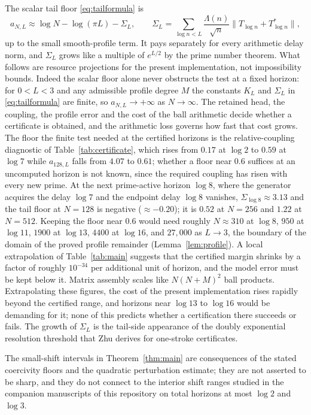 \documentclass[11pt]{article}
\numberwithin{equation}{section}
\theoremstyle{definition}
\theoremstyle{remark}
\newcommand{\norm}[1]{\lVert#1\rVert}
\begin{document}
The scalar tail floor \eqref{eq:tailformula} is
\[
 a_{N,L}\approx\log N-\log(\pi L)-\Sigma_L,\qquad
 \Sigma_L=\sum_{\log n<L}\frac{\Lambda(n)}{\sqrt n}\norm{T_{\log n}+T_{\log n}^*},
\]
up to the small smooth-profile term. It pays separately for every arithmetic
delay norm, and $\Sigma_L$ grows like a multiple of $e^{L/2}$ by the prime
number theorem. What follows are resource projections for the present
implementation, not impossibility bounds. Indeed the scalar floor alone never
obstructs the test at a fixed horizon: for $0<L<3$ and any admissible profile
degree $M$ the constants $K_L$ and $\Sigma_L$ in \eqref{eq:tailformula} are
finite, so $a_{N,L}\to+\infty$ as $N\to\infty$. The retained head, the
coupling, the profile error and the cost of the ball arithmetic decide whether
a certificate is obtained, and the arithmetic loss governs how fast that cost
grows. The floor the finite test needed at the certified horizons is the
relative-coupling diagnostic of Table~\ref{tab:certificate}, which rises from
$0.17$ at $\log2$ to $0.59$ at $\log7$ while $a_{128,L}$ falls from $4.07$ to
$0.61$; whether a floor near $0.6$ suffices at an uncomputed horizon is not
known, since the required coupling has risen with every new prime. At the
next prime-active horizon $\log8$, where the generator acquires the delay
$\log7$ and the endpoint delay $\log8$ vanishes, $\Sigma_{\log8}\approx3.13$
and the tail floor at $N=128$ is negative ($\approx-0.20$); it is $0.52$ at
$N=256$ and $1.22$ at $N=512$. Keeping the floor near $0.6$ would need roughly
$N\approx310$ at $\log8$, $950$ at $\log11$, $1900$ at $\log13$, $4400$ at
$\log16$, and $27{,}000$ as $L\to3$, the boundary of the domain of the proved
profile remainder (Lemma~\ref{lem:profile}). A local extrapolation of
Table~\ref{tab:main} suggests that the certified margin shrinks by a factor of
roughly $10^{-34}$ per additional unit of horizon, and the model error must be
kept below it. Matrix assembly scales like $N(N+M)^2$ ball products.
Extrapolating these figures, the cost of the present implementation rises
rapidly beyond the certified range, and horizons near $\log13$ to $\log16$
would be demanding for it; none of this predicts whether a certification there
succeeds or fails. The growth of $\Sigma_L$ is the tail-side appearance of the
doubly exponential resolution threshold that Zhu \cite{Zhu2026} derives for
one-stroke certificates.

The small-shift intervals in Theorem~\ref{thm:main} are consequences of the
stated coercivity floors and the quadratic perturbation estimate; they are
not asserted to be sharp, and they do not connect to the interior shift
ranges studied in the companion manuscripts of this repository on total
horizons at most $\log2$ and $\log3$.
\end{document}
